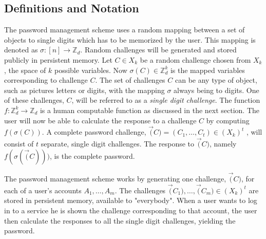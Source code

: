 \subsection{Definitions and Notation}
The password management scheme uses a random mapping between a set of objects to single digits which has to be memorized by the user. This mapping is denoted as $\sigma : [n] \rightarrow \mathbb{Z}_d$. Random challenges will be generated and stored publicly in persistent memory. Let $C \in X_k$ be a random challenge chosen from $X_k$, the space of $k$ possible variables. Now $\sigma (C) \in \mathbb{Z}_d^k$ is the mapped variables corresponding to challenge $C$. The set of challenges $C$ can be any type of object, such as pictures letters or digits, with the mapping $\sigma$ always being to digits. One of these challenges, $C$, will be referred to as a \emph{single digit challenge}. The function $f: \mathbb{Z}^k_d \rightarrow \mathbb{Z}_d$ is a human computable function as discussed in the next section. The user will now be able to calculate the response to a challenge $C$ by computing $f(\sigma(C))$. A complete password challenge, $\vec(C) = (C_1,\dots,C_t) \in (X_k)^t$ , will consist of $t$ separate, single digit challenges. The response to $\vec(C)$, namely $f(\sigma(\vec(C)))$, is the complete password. 
\par The password management scheme works by generating one challenge, $\vec(C)$, for each of a user's accounts $A_1,\dots,A_m$. The challenges $\vec(C_1),\dots,\vec(C_m) \in (X_k)^t$ are stored in persistent memory, available to "everybody". When a user wants to log in to a service he is shown the challenge corresponding to that account, the user then calculate the responses to all the single digit challenges, yielding the password.

